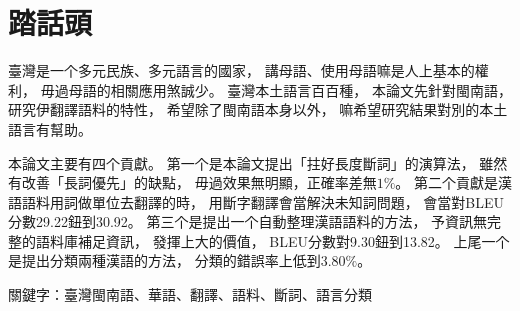 \chapter{踏話頭}
臺灣是一个多元民族、多元語言的國家，
講母語、使用母語嘛是人上基本的權利，
毋過母語的相關應用煞誠少。
臺灣本土語言百百種，
本論文先針對閩南語，
研究伊翻譯語料的特性，
希望除了閩南語本身以外，
嘛希望研究結果對別的本土語言有幫助。

本論文主要有四个貢獻。
第一个是本論文提出「拄好長度斷詞」的演算法，
雖然有改善「長詞優先」的缺點，
毋過效果無明顯，正確率差無$1\%$。
第二个貢獻是漢語語料用詞做單位去翻譯的時，
用斷字翻譯會當解決未知詞問題，
會當對BLEU分數29.22鈕到30.92。
第三个是提出一个自動整理漢語語料的方法，
予資訊無完整的語料庫補足資訊，
發揮上大的價值，
BLEU分數對9.30鈕到13.82。
上尾一个是提出分類兩種漢語的方法，
分類的錯誤率上低到$3.80\%$。

關鍵字：臺灣閩南語、華語、翻譯、語料、斷詞、語言分類
